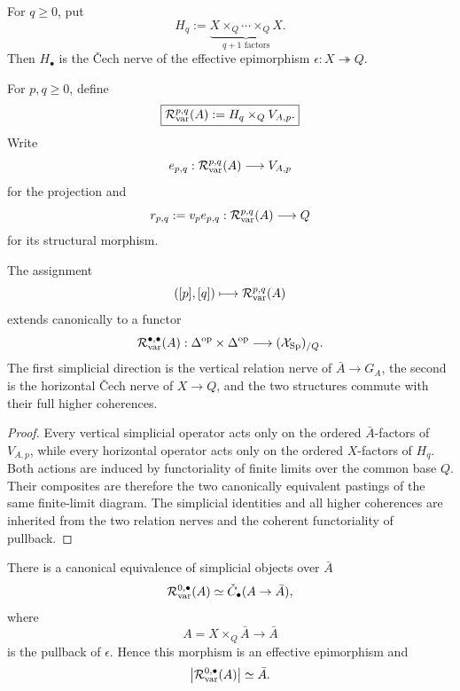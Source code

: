 \begin{definition}
\label{def:var-horizontal-relation}
For \(q\ge0\), put
\[
    H_q
    :=
    \underbrace{X\times_Q\cdots\times_QX}_{q+1\text{ factors}}.
\]
Then \(H_\bullet\) is the \v{C}ech nerve of the effective epimorphism \(\epsilon:X\twoheadrightarrow Q\).
\end{definition}

\begin{definition}
\label{def:var-double-relation}
For \(p,q\ge0\), define
\[
    \boxed{
    \mathcal R_{\mathrm{var}}^{p,q}(A):=H_q\times_QV_{A,p}.
    }
\]
Write
\[
    e_{p,q}:\mathcal R_{\mathrm{var}}^{p,q}(A)\longrightarrow V_{A,p}
\]
for the projection and
\[
    r_{p,q}:=v_pe_{p,q}:\mathcal R_{\mathrm{var}}^{p,q}(A)\longrightarrow Q
\]
for its structural morphism.
\end{definition}

\begin{theorem}
\label{thm:var-bisimplicial-relation}
The assignment
\[
    ([p],[q])\longmapsto\mathcal R_{\mathrm{var}}^{p,q}(A)
\]
extends canonically to a functor
\[
    \mathcal R_{\mathrm{var}}^{\bullet,\bullet}(A):
    \Delta^{\mathrm{op}}\times\Delta^{\mathrm{op}}
    \longrightarrow
    (\mathcal{X}_{\mathrm{Sp}})_{/Q}.
\]
The first simplicial direction is the vertical relation nerve of \(\bar A\to G_A\), the second is the horizontal \v{C}ech nerve of \(X\to Q\), and the two structures commute with their full higher coherences.
\end{theorem}

\begin{proof}
Every vertical simplicial operator acts only on the ordered \(\bar A\)-factors of \(V_{A,p}\), while every horizontal operator acts only on the ordered \(X\)-factors of \(H_q\). Both actions are induced by functoriality of finite limits over the common base \(Q\). Their composites are therefore the two canonically equivalent pastings of the same finite-limit diagram. The simplicial identities and all higher coherences are inherited from the two relation nerves and the coherent functoriality of pullback.
\end{proof}

\begin{proposition}
\label{prop:var-horizontal-boundary}
There is a canonical equivalence of simplicial objects over \(\bar A\)
\[
    \mathcal R_{\mathrm{var}}^{0,\bullet}(A)
    \simeq
    \check C_\bullet(A\to\bar A),
\]
where
\[
    A=X\times_Q\bar A\longrightarrow\bar A
\]
is the pullback of \(\epsilon\). Hence this morphism is an effective epimorphism and
\[
    \left|\mathcal R_{\mathrm{var}}^{0,\bullet}(A)\right|\simeq\bar A.
\]
\end{proposition}

